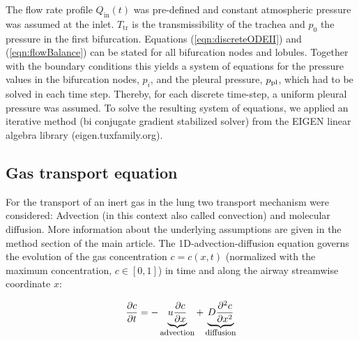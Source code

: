 The flow rate profile $Q_\mathrm{in}(t)$ was pre-defined and constant atmospheric pressure was assumed at the inlet.
$T_\mathrm{tr}$ is the transmissibility of the trachea and $p_0$ the pressure in the first bifurcation.
Equations (\ref{eqn:discreteODEII}) and (\ref{eqn:flowBalance}) can be stated for all bifurcation nodes and lobules.
Together with the boundary conditions this yields a system of equations for the pressure values in the bifurcation nodes, $p_i$, and the pleural pressure, $p_{\mathrm{pl}}$, which had to be solved in each time step.
Thereby, for each discrete time-step, a uniform pleural pressure was assumed.
To solve the resulting system of equations, we applied an iterative method (bi conjugate gradient stabilized solver) from the EIGEN linear algebra library (eigen.tuxfamily.org).


\subsection{Gas transport equation} \label{ssec:gas}
For the transport of an inert gas in the lung two transport mechanism were considered: Advection (in this context also called convection) and molecular diffusion.
More information about the underlying assumptions are given in the method section of the main article.
The 1D-advection-diffusion equation governs the evolution of the gas concentration $c = c(x,t)$ (normalized with the maximum concentration, $c\in[0,1]$) in time and along the airway streamwise coordinate $x$:

\begin{equation} \label{eqn:advection_diffusion}
\frac{\partial c}{\partial t} = -\underbrace{u\frac{\partial c}{\partial x}}_{\text{\footnotesize{advection}}} + \underbrace{D\frac{\partial^2 c}{\partial x^2}}_{\text{\footnotesize{diffusion}}}
\end{equation}

